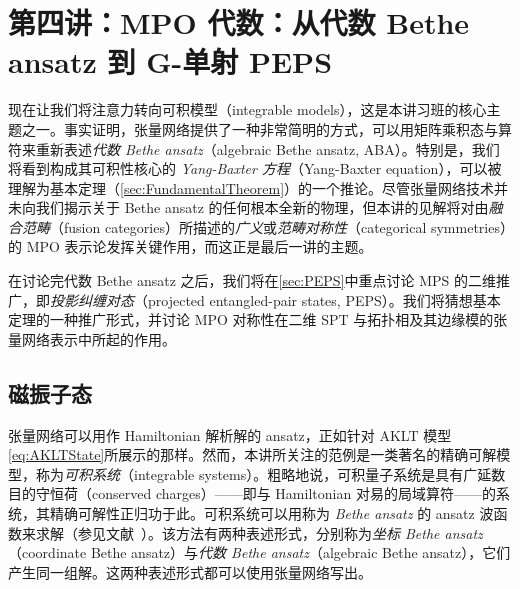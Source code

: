 \section{第四讲：MPO 代数：从代数 Bethe ansatz 到 G-单射 PEPS}
现在让我们将注意力转向可积模型（integrable models），这是本讲习班的核心主题之一。事实证明，张量网络提供了一种非常简明的方式，可以用矩阵乘积态与算符来重新表述\emph{代数 Bethe ansatz}（algebraic Bethe ansatz, ABA）。特别是，我们将看到构成其可积性核心的 \emph{Yang-Baxter 方程}（Yang-Baxter equation），可以被理解为基本定理（\cref{sec:FundamentalTheorem}）的一个推论。尽管张量网络技术并未向我们揭示关于 Bethe ansatz 的任何根本全新的物理，但本讲的见解将对由\emph{融合范畴}（fusion categories）所描述的\emph{广义}或\emph{范畴对称性}（categorical symmetries）的 MPO 表示论发挥关键作用，而这正是最后一讲的主题。

在讨论完代数 Bethe ansatz 之后，我们将在\cref{sec:PEPS}中重点讨论 MPS 的二维推广，即\emph{投影纠缠对态}（projected entangled-pair states, PEPS）。我们将猜想基本定理的一种推广形式，并讨论 MPO 对称性在二维 SPT 与拓扑相及其边缘模的张量网络表示中所起的作用。
\subsection{磁振子态}\label{sec:magnon}
张量网络可以用作 Hamiltonian 解析解的 ansatz，正如针对 AKLT 模型\cref{eq:AKLTState}所展示的那样。然而，本讲所关注的范例是一类著名的精确可解模型，称为\emph{可积系统}（integrable systems）。粗略地说，可积量子系统是具有广延数目的守恒荷（conserved charges）——即与 Hamiltonian 对易的局域算符——的系统，其精确可解性正归功于此。可积系统可以用称为 \emph{Bethe ansatz} 的 ansatz 波函数来求解（参见文献~\cite{Gaudin2014}）。该方法有两种表述形式，分别称为\emph{坐标 Bethe ansatz}（coordinate Bethe ansatz）与\emph{代数 Bethe ansatz}（algebraic Bethe ansatz），它们产生同一组解。这两种表述形式都可以使用张量网络写出。

